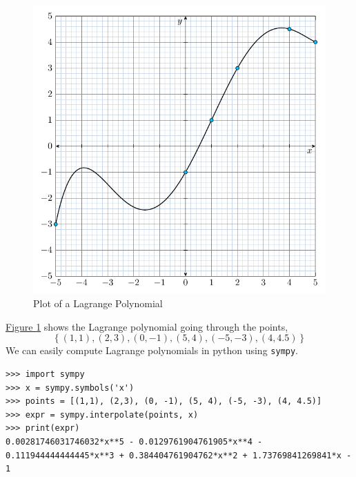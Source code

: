 \documentclass[11pt,numbers=noenddot,svgnames]{scrbook}
\begin{document}
\begin{figure}[H]
\centering
\includegraphics[scale=0.75]{figures/lagrange_poly_plot1.pdf}
\caption{Plot of a Lagrange Polynomial}
\label{fig:lagrange_poly_plot1}
\end{figure}

\hyperref[fig:lagrange_poly_plot1]{Figure \ref{fig:lagrange_poly_plot1}} shows the Lagrange polynomial going through 
the points, 
\[ \left\{(1,1), (2,3), (0, -1), (5, 4), (-5, -3), (4, 4.5) \right\}\] 
We can easily compute Lagrange polynomials in python using \texttt{sympy}.

\begin{mdcode}
\begin{verbatim}
>>> import sympy
>>> x = sympy.symbols('x')
>>> points = [(1,1), (2,3), (0, -1), (5, 4), (-5, -3), (4, 4.5)]
>>> expr = sympy.interpolate(points, x)
>>> print(expr)
0.00281746031746032*x**5 - 0.0129761904761905*x**4 - 0.111944444444445*x**3 + 0.384404761904762*x**2 + 1.73769841269841*x - 1
\end{verbatim}
\end{mdcode}
\end{document}
